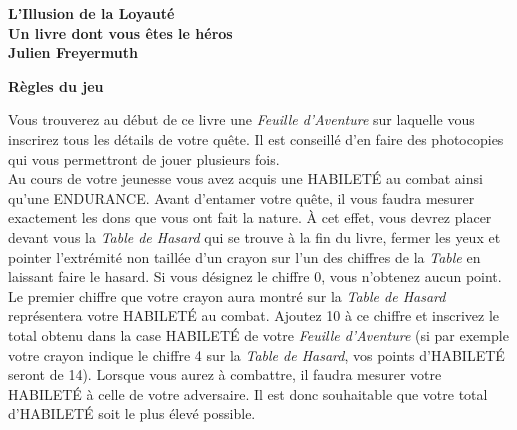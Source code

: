 \documentclass[12pt]{book}
\begin{document}
\frontmatter

\begin{titlepage}
    \begin{center}
        \textbf{\Huge L'Illusion de la Loyauté}\\[0.5cm]
        \textbf{\Large Un livre dont vous êtes le héros}\\[2cm]
        \textbf{\Large Julien Freyermuth}
    \end{center}
\end{titlepage}

\begin{center}
    \textbf{\Large{Règles du jeu}}\\
\end{center}
Vous trouverez au début de ce livre une \textit{Feuille d'Aventure} sur laquelle vous inscrirez
tous les détails de votre quête. Il est conseillé d'en faire des photocopies qui vous permettront de
jouer plusieurs fois.\\

Au cours de votre jeunesse vous avez acquis une HABILETÉ au combat ainsi qu'une ENDURANCE.
Avant d'entamer votre quête, il vous faudra mesurer exactement les dons que vous ont fait la
nature. À cet effet, vous devrez placer devant vous la \textit{Table de Hasard} qui se trouve
à la fin du livre, fermer les yeux et pointer l'extrémité non taillée d'un crayon sur l'un
des chiffres de la \textit{Table} en laissant faire le hasard. Si vous désignez le chiffre
0, vous n'obtenez aucun point.\\

Le premier chiffre que votre crayon aura montré sur la \textit{Table de
Hasard} représentera votre HABILETÉ au combat. Ajoutez 10 à ce
chiffre et inscrivez le total obtenu dans la case HABILETÉ de votre
\textit{Feuille d'Aventure} (si par exemple votre crayon indique le chiffre
4 sur la \textit{Table de Hasard}, vos points d'HABILETÉ seront de 14).
Lorsque vous aurez à combattre, il faudra mesurer votre
HABILETÉ à celle de votre adversaire. Il est donc souhaitable que
votre total d'HABILETÉ soit le plus élevé possible.\\



\mainmatter
\pagestyle{mainmatterstyle}
\end{document}
